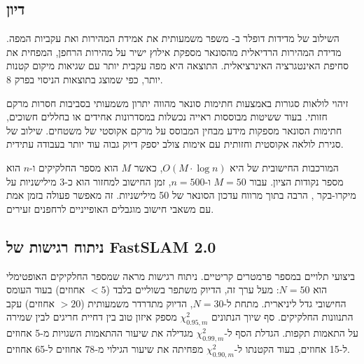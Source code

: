 \begin{table}[htbp]
\centering
\caption{השוואת גישות : מורכבות חישובית, יכולת הרחבה, התאמה לסונאר. (Comparison of SLAM approaches: computational complexity, scalability, suitability for sonar.)}
\label{tab:ch04_slam_comparison}
\end{table}

\subsection{דיון}
\label{sec:ch04_discussion}

השילוב של מדידות דופלר ב- משפר משמעותית את אמידת המהירות ואת עקביות המפה. מדידת המהירות הרדיאלית מהסונאר מספקת אילוץ ישיר על מהירות הרחפן, המפחית את סחיפת האינטגרציה האינרציאלית. התוצאה היא מפה עקבית יותר עם שגיאות מיקום קטנות יותר, כפי שמוצג בתוצאות הניסוי בפרק 8.

זיהוי לולאות סגורות באמצעות חתימות סונאר מהווה יתרון משמעותי בסביבות חסרות מרקם חזותי. בעוד ששיטות מבוססות ראייה נכשלות במסדרונות אחידים או בחללים חשוכים, חתימות הסונאר מספקות מידע מבחין המבוסס על מרקם אקוסטי של משטחים. שילוב של סגירת לולאה אקוסטית וחזותית עם אימות צולב יספק דיוק גבוה עוד יותר בעבודה עתידית.

המורכבות החישובית של  היא $O(M \cdot \log n)$, כאשר $M$ הוא מספר החלקיקים ו-$n$ הוא מספר נקודות הציון. עבור $M=50$ ו-$n=500$, זמן החישוב למחזור הוא כ-3 מילישניות על מיקרו-בקר , הרבה בתוך מרווח עדכון הסונאר של 50 מילישניות. זה מאפשר פעולה בזמן אמת עם משאבי חישוב מוגבלים האופייניים לרחפנים זעירים.

\subsection{ניתוח רגישות של FastSLAM 2.0}
\label{sec:ch04_sensitivity}

ביצועי  תלויים במספר פרמטרים קריטיים. ניתוח רגישות מראה שמספר החלקיקים האופטימלי הוא $N=50$: מעל ערך זה, הדיוק משתפר בשוליים בלבד ($<5$ אחוזים) בעוד העומס החישובי גדל ליניארית. מתחת ל-$N=30$, הדיוק מתדרדר משמעותית ($>20$ אחוזים) עקב התנוונות החלקיקים. סף שיוך הנתונים $\chi^2_{0.95, m}$ מספק איזון טוב בין דחיית חריגים לבין שמירה על התאמות תקפות. הגדלת הסף ל-$\chi^2_{0.99, m}$ מגדילה את שיעור ההתאמות השגויות מ-5 אחוזים ל-15 אחוזים, בעוד הקטנתו ל-$\chi^2_{0.90, m}$ מפחיתה את שיעור הגילוי מ-78 אחוזים ל-65 אחוזים.

